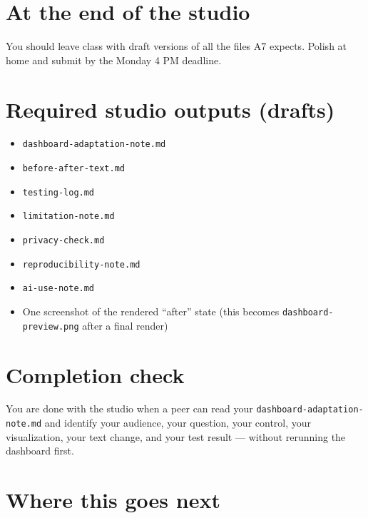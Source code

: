 \documentclass[
  letterpaper,
  DIV=11,
  numbers=noendperiod,
  oneside]{scrreprt}
\providecommand{\tightlist}{%
  \setlength{\itemsep}{0pt}\setlength{\parskip}{0pt}}
\begin{document}
\section*{At the end of the studio}\label{at-the-end-of-the-studio}


You should leave class with draft versions of all the files A7 expects.
Polish at home and submit by the Monday 4 PM deadline.

\section*{Required studio outputs
(drafts)}\label{required-studio-outputs-drafts}


\begin{itemize}
\tightlist
\item
  \texttt{dashboard-adaptation-note.md}
\item
  \texttt{before-after-text.md}
\item
  \texttt{testing-log.md}
\item
  \texttt{limitation-note.md}
\item
  \texttt{privacy-check.md}
\item
  \texttt{reproducibility-note.md}
\item
  \texttt{ai-use-note.md}
\item
  One screenshot of the rendered ``after'' state (this becomes
  \texttt{dashboard-preview.png} after a final render)
\end{itemize}

\section*{Completion check}\label{completion-check-2}


You are done with the studio when a peer can read your
\texttt{dashboard-adaptation-note.md} and identify your audience, your
question, your control, your visualization, your text change, and your
test result --- without rerunning the dashboard first.

\section*{Where this goes next}\label{where-this-goes-next-19}
\end{document}
